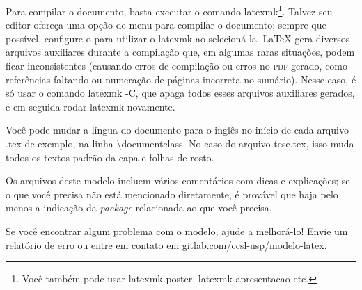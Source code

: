 Para compilar o documento, basta executar o comando
\textsf{latexmk}\footnote{Você também pode usar \textsf{latexmk poster},
\textsf{latexmk apresentacao} etc.}. Talvez seu editor ofereça uma opção
de menu para compilar o documento; sempre que possível, configure-o para
utilizar o \textsf{latexmk} ao selecioná-la. \LaTeX{} gera diversos arquivos
auxiliares durante a compilação que, em algumas raras situações, podem ficar
inconsistentes (causando erros de compilação ou erros no \textsc{pdf} gerado,
como referências faltando ou numeração de páginas incorreta no sumário).
Nesse caso, é só usar o comando \textsf{latexmk -C}, que apaga todos esses
arquivos auxiliares gerados, e em seguida rodar \textsf{latexmk} novamente.

Você pode mudar a língua do documento para o inglês no início de cada
arquivo .tex de exemplo, na linha \textsf{\textbackslash{}documentclass}.
No caso do arquivo \textsf{tese.tex}, isso muda todos os textos padrão
da capa e folhas de rosto.

Os arquivos deste modelo incluem vários comentários com dicas e explicações;
se o que você precisa não está mencionado diretamente, é provável que haja
pelo menos a indicação da \textit{package} relacionada ao que você precisa.

Se você encontrar algum problema com o modelo, ajude a melhorá-lo!
Envie um relatório de erro ou entre em contato em
\url{gitlab.com/ccsl-usp/modelo-latex}.

\enlargethispage{.8\baselineskip}
